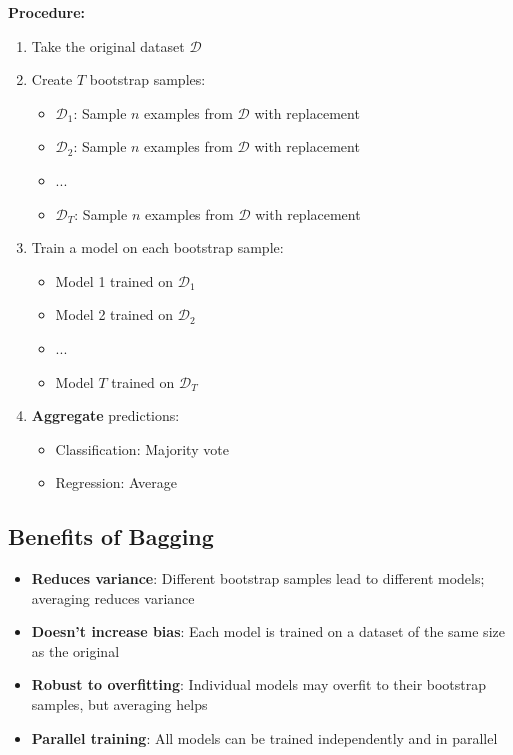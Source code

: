 \documentclass[11pt,a4paper]{article}
\theoremstyle{definition}
\theoremstyle{plain}
\theoremstyle{remark}
\begin{document}
\textbf{Procedure:}
\begin{enumerate}
    \item Take the original dataset \(\mathcal{D}\)
    
    \item Create \(T\) bootstrap samples:
    \begin{itemize}
        \item \(\mathcal{D}_1\): Sample \(n\) examples from \(\mathcal{D}\) with replacement
        \item \(\mathcal{D}_2\): Sample \(n\) examples from \(\mathcal{D}\) with replacement
        \item ...
        \item \(\mathcal{D}_T\): Sample \(n\) examples from \(\mathcal{D}\) with replacement
    \end{itemize}
    
    \item Train a model on each bootstrap sample:
    \begin{itemize}
        \item Model 1 trained on \(\mathcal{D}_1\)
        \item Model 2 trained on \(\mathcal{D}_2\)
        \item ...
        \item Model \(T\) trained on \(\mathcal{D}_T\)
    \end{itemize}
    
    \item \textbf{Aggregate} predictions:
    \begin{itemize}
        \item Classification: Majority vote
        \item Regression: Average
    \end{itemize}
\end{enumerate}

\subsection{Benefits of Bagging}

\begin{itemize}
    \item \textbf{Reduces variance}: Different bootstrap samples lead to different models; averaging reduces variance
    
    \item \textbf{Doesn't increase bias}: Each model is trained on a dataset of the same size as the original
    
    \item \textbf{Robust to overfitting}: Individual models may overfit to their bootstrap samples, but averaging helps
    
    \item \textbf{Parallel training}: All models can be trained independently and in parallel
\end{itemize}
\end{document}
